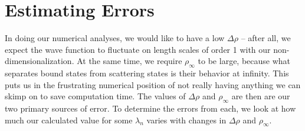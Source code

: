 \documentclass[12pt,twoside]{reedthesis}
\begin{document}
\section{Estimating Errors}
In doing our numerical analyses, we would like to have a low $\Delta \rho$ -- after all, we expect the wave function to fluctuate on length scales of order 1 with our non-dimensionalization. At the same time, we require $\rho_{\infty}$ to be large, because what separates bound states from scattering states is their behavior at infinity. This puts us in the frustrating numerical position of not really having anything we can skimp on to save computation time. The values of $\Delta \rho$ and $\rho_\infty$ are then are our two primary sources of error. To determine the errors from each, we look at how much our calculated value for some $\lambda_{n}$ varies with changes in $\Delta \rho$ and $\rho_{\infty}$.  
\end{document}
